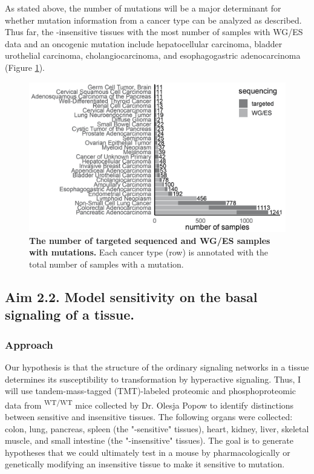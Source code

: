 As stated above, the number of \KRAS{} mutations will be a major determinant for whether mutation information from a cancer type can be analyzed as described.
Thus far, the \KRAS{}-insensitive tissues with the most number of samples with WG/ES data and an oncogenic \KRAS{} mutation include hepatocellular carcinoma, bladder urothelial carcinoma, cholangiocarcinoma, and esophagogastric adenocarcinoma (Figure \ref{fig:num-samples-kras-resistant}).

\begin{figure}[t!]
\centering
\includegraphics[width=120mm]{figures/aim2/kras-mutations-from-insensitive-tissues.jpg}
\caption{
    \textbf{The number of targeted sequenced and WG/ES samples with \KRAS{} mutations.}
    Each cancer type (row) is annotated with the total number of samples with a \KRAS{} mutation.
}
\label{fig:num-samples-kras-resistant}
\end{figure}


\subsection*{Aim 2.2. Model \KRAS{} sensitivity on the basal signaling of a tissue.}

\subsubsection*{Approach}

Our hypothesis is that the structure of the ordinary signaling networks in a tissue determines its susceptibility to transformation by hyperactive \kras{} signaling.
Thus, I will use tandem-mass-tagged (TMT)-labeled \cite{Thompson2003} proteomic and phosphoproteomic data from \moKRAS{}\textsuperscript{WT/WT} mice collected by Dr. Olesja Popow to identify distinctions between sensitive and insensitive tissues.
The following organs were collected: colon, lung, pancreas, spleen (the "\KRAS{}-sensitive" tissues), heart, kidney, liver, skeletal muscle, and small intestine (the "\KRAS{}-insensitive" tissues).
The goal is to generate hypotheses that we could ultimately test in a mouse by pharmacologically or genetically modifying an insensitive tissue to make it sensitive to \KRAS{} mutation.

